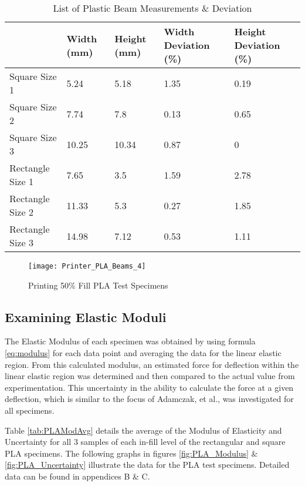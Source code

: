 	\begin{table} [h]
		\centering
		\begin{tabularx}{\textwidth}{  X  X  X  X  X  }
		\noalign{\hrule height 2pt}
			& Width (mm) & Height (mm) & Width Deviation (\%) & Height Deviation (\%) \\ \hline
			Square Size 1 & 5.24 & 5.18 & 1.35 & 0.19 \\ 
			Square Size 2 & 7.74 & 7.8 & 0.13 & 0.65 \\ 
			Square Size 3 & 10.25 & 10.34 & 0.87 & 0 \\ \hline
			Rectangle Size 1 & 7.65 & 3.5 & 1.59 & 2.78 \\ 
			Rectangle Size 2 & 11.33 & 5.3 & 0.27 & 1.85 \\ 
			Rectangle Size 3 & 14.98 & 7.12 & 0.53 & 1.11 \\ \hline
		\end{tabularx}
		\caption{List of Plastic Beam Measurements \& Deviation}
		\label{tab:BeamComp}
	\end{table}
	
	\begin{figure} [H]
		\centering
		\caption{Printing 50\% Fill PLA Test Specimens}
		\texttt{[image: Printer\_PLA\_Beams\_4]}
		\label{fig:50_PLA}
	\end{figure}
		
\subsection{Examining Elastic Moduli}
	The Elastic Modulus of each specimen was obtained by using formula \ref{eq:modulus} for each data point and averaging the data for the linear elastic region. From this calculated modulus, an estimated force for deflection within the linear elastic region was determined and then compared to the actual value from experimentation. This uncertainty in the ability to calculate the force at a given deflection, which is similar to the focus of Adamczak, et al., was investigated for all specimens. \citep{Adamczak2014} 
	
	Table \ref{tab:PLAModAvg} details the average of the Modulus of Elasticity and Uncertainty for all 3 samples of each in-fill level of the rectangular and square PLA specimens. The following graphs in figures \ref{fig:PLA_Modulus} \& \ref{fig:PLA_Uncertainty} illustrate the data for the PLA test specimens. Detailed data can be found in appendices B \& C.
	
